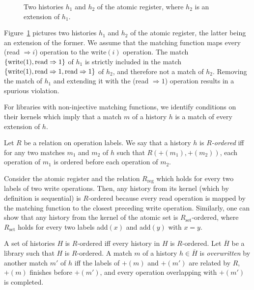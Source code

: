 \begin{figure}

  

  \caption{Two histories $h_1$ and $h_2$ of the atomic register, where $h_2$ is
  an extension of $h_1$.}
  \label{fig:removal_even_saturation}

\end{figure}

\begin{example}
  \label{ex:removal_even_saturation}

  Figure~\ref{fig:removal_even_saturation} pictures two histories $h_1$ and
  $h_2$ of the atomic register, the latter being an extension of the former. We
  assume that the matching function maps every (\textnormal{read} $\Rightarrow i$) operation to
  the \textnormal{write}$(i)$ operation. The match ${\{  \textnormal{write}(1),
  \textnormal{read}\Rightarrow 1  \}}$ of $h_1$ is strictly included in the match ${\{ 
  \textnormal{write}(1), \textnormal{read}\Rightarrow 1, \textnormal{read}\Rightarrow 1  \}}$ of
  $h_2$, and therefore not a match of $h_2$. Removing the match of $h_1$ and
  extending it with the (\textnormal{read} $\Rightarrow 1$) operation results in a spurious
  violation.

\end{example}

For libraries with non-injective matching functions, we identify conditions on their kernels 
which imply that a match $m$ of a history $h$ is a match of
every extension of $h$.

Let $R$ be a relation on operation labels. We say that a history $h$ is
\emph{$R$-ordered} iff for any two matches $m_1$ and $m_2$ of $h$ such that
$R(+(m_1), +(m_2))$, each operation of $m_1$ is ordered before each operation
of $m_2$.

Consider the atomic register and the relation $R_\mathrm{reg}$ which holds for
every two labels of two write operations. Then, any history from its kernel
(which by definition is sequential) is $R$-ordered because every read operation
is mapped by the matching function to the closest preceding write operation.
Similarly, one can show that any history from the kernel of the atomic set is
$R_\mathrm{set}$-ordered, where $R_\mathrm{set}$ holds for every two labels
add$(x)$ and add$(y)$ with $x = y$.

A set of histories $H$ is $R$-ordered iff every history in $H$ is $R$-ordered.
Let $\overline{H}$ be a library such that $H$ is $R$-ordered. A match $m$ of a
history $h\in \overline{H}$ is \emph{overwritten} by another match $m'$ of $h$
iff the labels of $+(m)$ and $+(m')$ are related by $R$, $+(m)$ finishes before
$+(m')$, and every operation overlapping with $+(m')$ is completed.

